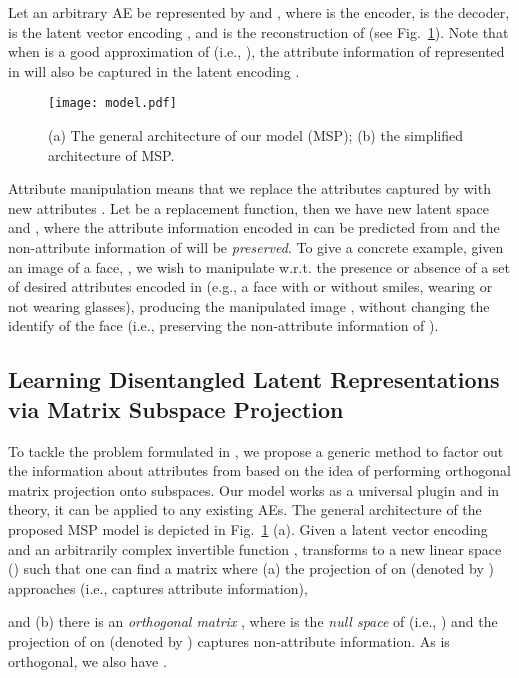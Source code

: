 \documentclass{article}
\begin{document}
Let an arbitrary AE be represented by  and , where  is the encoder,  is the decoder,  is the latent vector encoding , and  is the reconstruction of  (see Fig.~\ref{fig:model}). Note that when  is a good approximation of  (i.e., ), the attribute information of  represented in  will also be captured in the latent encoding . 
\begin{figure}[tb]
\hspace*{-0.4cm}
    \centering
    \texttt{[image: model.pdf]}\vspace{-2ex}
    \caption{(a) The general architecture of our model (MSP); (b) the simplified architecture of MSP.}
    \label{fig:model}
\end{figure}
Attribute manipulation means that we 
replace the attributes  captured by  with new attributes . Let  be a replacement function, then we have new latent space  and , where the attribute information encoded in  can be predicted from  and the non-attribute information of   will be \textit{preserved}. To give a concrete example, given an image of a face, , we wish to manipulate  w.r.t. the presence or absence of a set of desired attributes encoded in  (e.g., a face with or without smiles, wearing or not wearing glasses), producing the manipulated image , without changing the identify of the face (i.e., preserving the non-attribute information of ). 


\subsection{Learning Disentangled Latent Representations via Matrix Subspace Projection}


To tackle the problem formulated in , we propose a generic method to factor out the information about attributes  from  based on the idea of performing orthogonal matrix projection onto subspaces.  Our model works as a universal plugin and in theory, it can be applied to any existing AEs. The general architecture of the proposed MSP model is depicted in Fig.~\ref{fig:model} (a). 
Given a latent vector  encoding  and an arbitrarily complex invertible function ,  transforms  to a new linear space () such that one can find a matrix  where  
(a) the projection of  on  (denoted by ) approaches   (i.e.,  captures attribute information), 

and (b) there is an \textit{orthogonal matrix} , where  is the \textit{null space} of  (i.e., ) and the projection of  on  (denoted by ) captures non-attribute information. 
As  is orthogonal, we also have . 
\end{document}

